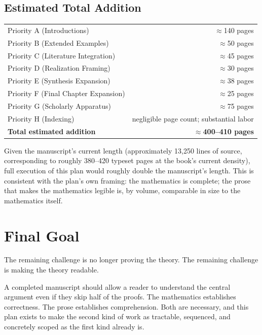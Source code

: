 \documentclass[11pt]{report}
\begin{document}
\section{Estimated Total Addition}

\begin{deliverable}
\begin{tabular}{@{}lr@{}}
Priority A (Introductions) & $\approx$140 pages \\
Priority B (Extended Examples) & $\approx$50 pages \\
Priority C (Literature Integration) & $\approx$45 pages \\
Priority D (Realization Framing) & $\approx$30 pages \\
Priority E (Synthesis Expansion) & $\approx$38 pages \\
Priority F (Final Chapter Expansion) & $\approx$25 pages \\
Priority G (Scholarly Apparatus) & $\approx$75 pages \\
Priority H (Indexing) & negligible page count; substantial labor \\
\midrule
\textbf{Total estimated addition} & \textbf{$\approx$400--410 pages} \\
\end{tabular}
\end{deliverable}

Given the manuscript's current length (approximately 13{,}250
lines of source, corresponding to roughly 380--420 typeset
pages at the book's current density), full execution of this
plan would roughly double the manuscript's length. This is
consistent with the plan's own framing: the mathematics is
complete; the prose that makes the mathematics legible is, by
volume, comparable in size to the mathematics itself.

\chapter*{Final Goal}

The remaining challenge is no longer proving the theory. The
remaining challenge is making the theory readable.

A completed manuscript should allow a reader to understand the
central argument even if they skip half of the proofs. The
mathematics establishes correctness. The prose establishes
comprehension. Both are necessary, and this plan exists to make
the second kind of work as tractable, sequenced, and concretely
scoped as the first kind already is.
\end{document}
